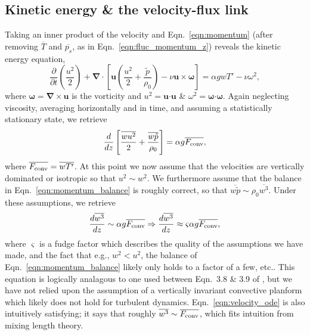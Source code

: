 \documentclass{aastex631}
\newcommand{\Fconv}{\ensuremath{F_{\rm{conv}}}}
\renewcommand{\vec}[1]{\boldsymbol{#1}}
\renewcommand{\dot}{\vec{\cdot}}
\newcommand{\grad}{\vec{\nabla}}
\begin{document}
\subsection{Kinetic energy \& the velocity-flux link}
\label{sec:theory_energy}
Taking an inner product of the velocity and Eqn.~\ref{eqn:momentum} (after removing $\overline{T}$ and $\overline{p_s}$, as in Eqn.~\ref{eqn:fluc_momentum_z}) reveals the kinetic energy equation,
\begin{equation}
\frac{\partial}{\partial t}\left(\frac{u^2}{2}\right) 
+ \grad\cdot\left[\vec{u}\left(\frac{u^2}{2} + \frac{\tilde{p}}{\rho_0}\right) - \nu\vec{u}\times\vec{\omega}\right]
= \alpha g w T' - \nu\omega^2,
\label{eqn:kinetic_energy}
\end{equation}
where $\vec{\omega} = \grad\times\vec{u}$ is the vorticity and $u^2 = \vec{u}\dot\vec{u}$ \& $\omega^2 = \vec{\omega}\dot\vec{\omega}$.
Again neglecting viscosity, averaging horizontally and in time, and assuming a statistically stationary state, we retrieve
\begin{equation}
\frac{d}{dz}\left[\frac{\overline{w u^2}}{2} + \frac{\overline{w\tilde{p}}}{\rho_0}\right]
= \alpha g \overline{\Fconv},
\label{eqn:mean_ke}
\end{equation}
where $\overline{\Fconv} = \overline{w T'}$.
At this point we now assume that the velocities are vertically dominated or isotropic so that $u^2 \sim w^2$.
We furthermore assume that the balance in Eqn.~\ref{eqn:momentum_balance} is roughly correct, so that $\overline{w\tilde{p}} \sim \rho_0 \overline{w^3}$.
Under these assumptions, we retrieve
\begin{equation}
\frac{d \overline{w^3}}{dz} \sim \alpha g \overline{\Fconv}
\Rightarrow
\frac{d \overline{w^3}}{dz} \approx \varsigma \alpha g \overline{\Fconv},
\label{eqn:velocity_ode}
\end{equation}
where $\varsigma$ is a fudge factor which describes the quality of the assumptions we have made, and the fact that e.g., $w^2 < u^2$, the balance of Eqn.~\ref{eqn:momentum_balance} likely only holds to a factor of a few, etc..
This equation is logically analagous to one used between Eqn.~3.8 \& 3.9 of \citet{zahn1991}, but we have not relied upon the assumption of a vertically invariant convective planform which likely does not hold for turbulent dynamics.
Eqn.~\ref{eqn:velocity_ode} is also intuitively satisfying; it says that roughly $\overline{w^3} \sim \overline{\Fconv}$, which fits intuition from mixing length theory.
\end{document}
